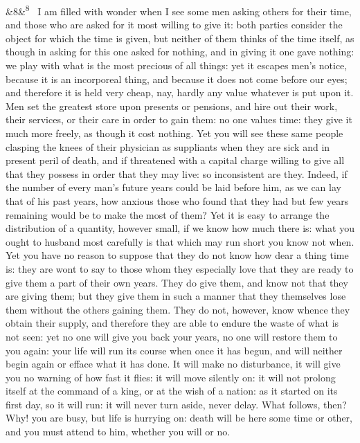 \documentclass[12pt]{article}
\newcommand{\para}[1][]{\par\noindent\ifx&#1&\else\textsuperscript{\footnotesize #1}~\fi}
\begin{document}
\para[8] I am filled with wonder when I see some men asking others for their time, and those who are asked for it most willing to give it: both parties consider the object for which the time is given, but neither of them thinks of the time itself, as though in asking for this one asked for nothing, and in giving it one gave nothing: we play with what is the most precious of all things: yet it escapes men’s notice, because it is an incorporeal thing, and because it does not come before our eyes; and therefore it is held very cheap, nay, hardly any value whatever is put upon it. Men set the greatest store upon presents or pensions, and hire out their work, their services, or their care in order to gain them: no one values time: they give it much more freely, as though it cost nothing. Yet you will see these same people clasping the knees of their physician as suppliants when they are sick and in present peril of death, and if threatened with a capital charge willing to give all that they possess in order that they may live: so inconsistent are they. Indeed, if the number of every man’s future years could be laid before him, as we can lay that of his past years, how anxious those who found that they had but few years remaining would be to make the most of them? Yet it is easy to arrange the distribution of a quantity, however small, if we know how much there is: what you ought to husband most carefully is that which may run short you know not when. Yet you have no reason to suppose that they do not know how dear a thing time is: they are wont to say to those whom they especially love that they are ready to give them a part of their own years. They do give them, and know not that they are giving them; but they give them in such a manner that they themselves lose them without the others gaining them. They do not, however, know whence they obtain their supply, and therefore they are able to endure the waste of what is not seen: yet no one will give you back your years, no one will restore them to you again: your life will run its course when once it has begun, and will neither begin again or efface what it has done. It will make no disturbance, it will give you no warning of how fast it flies: it will move silently on: it will not prolong itself at the command of a king, or at the wish of a nation: as it started on its first day, so it will run: it will never turn aside, never delay. What follows, then? Why! you are busy, but life is hurrying on: death will be here some time or other, and you must attend to him, whether you will or no.
\end{document}
